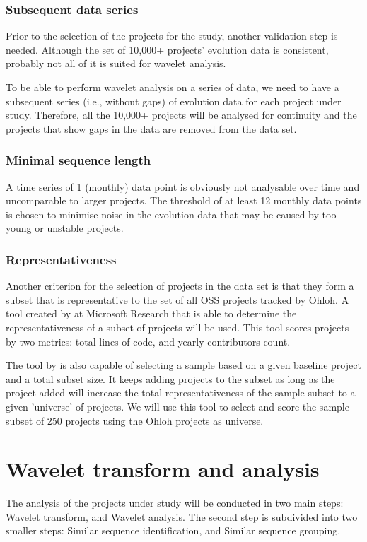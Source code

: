 \subsubsection{Subsequent data series}
Prior to the selection of the projects for the study, another validation
step is needed. Although the set of 10,000+ projects' evolution data is
consistent, probably not all of it is suited for wavelet analysis.

To be able to perform wavelet analysis on a series of data, we need to have
a subsequent series (i.e., without gaps) of evolution data for each project
under study. Therefore, all the 10,000+ projects will be analysed for continuity
and the projects that show gaps in the data are removed from the data set.

\subsubsection{Minimal sequence length}
A time series of 1 (monthly) data point is obviously not analysable over time
and uncomparable to larger projects. The threshold of at least 12 monthly data
points is chosen to minimise noise in the evolution data that may be caused by
too young or unstable projects.

\subsubsection{Representativeness}
Another criterion for the selection of projects in the data set is that they
form a subset that is representative to the set of all OSS projects tracked by
Ohloh. A tool created by \citet{nagappan} at Microsoft Research that is able
to determine the representativeness of a subset of projects will be used. This
tool scores projects by two metrics: total lines of code, and yearly
contributors count.

The tool by \citet{nagappan} is also capable of selecting a sample based on a
given baseline project and a total subset size. It keeps adding projects to the
subset as long as the project added will increase the total representativeness
of the sample subset to a given 'universe' of projects. We will use this tool
to select and score the sample subset of 250 projects using the Ohloh projects
as universe.



\section{Wavelet transform and analysis}
The analysis of the projects under study will be conducted in two main steps:
Wavelet transform, and Wavelet analysis. The second step is subdivided into two
smaller steps: Similar sequence identification, and Similar sequence grouping.

